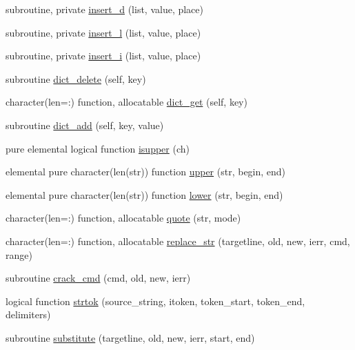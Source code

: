 \begin{DoxyCompactItemize}
subroutine, private \mbox{\hyperlink{namespacem__cli_a030e31579a7968aea68d80db1e36ebfd}{insert\+\_\+d}} (list, value, place)
\item 
subroutine, private \mbox{\hyperlink{namespacem__cli_a0c1b22c46470afbb4ee5c67180335578}{insert\+\_\+l}} (list, value, place)
\item 
subroutine, private \mbox{\hyperlink{namespacem__cli_a841685591ef1f1827fc1fe32a7f546f1}{insert\+\_\+i}} (list, value, place)
\item 
subroutine \mbox{\hyperlink{namespacem__cli_aff32e44070983c7fb4eb0a3b1dea7a6d}{dict\+\_\+delete}} (self, key)
\item 
character(len=\+:) function, allocatable \mbox{\hyperlink{namespacem__cli_ac4a889309ffc333af6bf8e11f1fc4869}{dict\+\_\+get}} (self, key)
\item 
subroutine \mbox{\hyperlink{namespacem__cli_a1be098e2b920e8d50ed14be03a3133db}{dict\+\_\+add}} (self, key, value)
\item 
pure elemental logical function \mbox{\hyperlink{namespacem__cli_a4c126288dc18289b2095a0882f10ca77}{isupper}} (ch)
\item 
elemental pure character(len(str)) function \mbox{\hyperlink{namespacem__cli_aef6f54c9cb37251dfd664c0845186a40}{upper}} (str, begin, end)
\item 
elemental pure character(len(str)) function \mbox{\hyperlink{namespacem__cli_a685574282a09c3f57e0c18654a3a642c}{lower}} (str, begin, end)
\item 
character(len=\+:) function, allocatable \mbox{\hyperlink{namespacem__cli_ac82fec2a5441020701fe3c64af3d9948}{quote}} (str, mode)
\item 
character(len=\+:) function, allocatable \mbox{\hyperlink{namespacem__cli_a40e02b1c9fc580ddd410bb24017fab8c}{replace\+\_\+str}} (targetline, old, new, ierr, cmd, range)
\item 
subroutine \mbox{\hyperlink{namespacem__cli_a8d5d1954aac6494e07fb11f12f635c85}{crack\+\_\+cmd}} (cmd, old, new, ierr)
\item 
logical function \mbox{\hyperlink{namespacem__cli_a0015c38f9fa45a58ba6ae89f2ddb54f1}{strtok}} (source\+\_\+string, itoken, token\+\_\+start, token\+\_\+end, delimiters)
\item 
subroutine \mbox{\hyperlink{namespacem__cli_a3b66fe9cee0e084068051636afb2957d}{substitute}} (targetline, old, new, ierr, start, end)
\end{DoxyCompactItemize}

